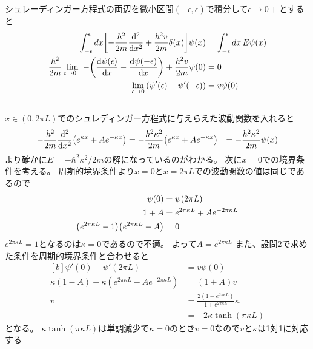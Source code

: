 \documentclass[../../sp_2014.tex]{subfiles}
\begin{document}
\subsection{}
シュレーディンガー方程式の両辺を微小区間\((-\epsilon,\epsilon)\)で積分して\(\epsilon\to0+\)とすると
\begin{equation}\begin{aligned}[b]
    \int_{-\epsilon}^\epsilon dx\qty[-\frac{\hbar^2}{2m}\dv[2]{x}+\frac{\hbar^2 v}{2m}\delta(x)]\psi(x)
    &= \int_{-\epsilon}^{\epsilon} dx\, E\psi(x)\\
    \frac{\hbar^2}{2m}\lim_{\epsilon\to0+}-\qty(\dv{\psi(\epsilon)}{x}-\dv{\psi(-\epsilon)}{x})+\frac{\hbar^2v}{2m}\psi(0)&=0\\
    \lim_{\epsilon\to0}\qty(\psi'(\epsilon)-\psi'(-\epsilon))&=v\psi(0)
\end{aligned}\end{equation}

\subsection{}
\(x\in (0,2\pi L)\)でのシュレディンガー方程式に与えらえた波動関数を入れると
\begin{equation}\begin{aligned}[b]
    -\frac{\hbar^2}{2m}\dv[2]{x}\qty(e^{\kappa x}+Ae^{-\kappa x}) &= -\frac{\hbar^2 \kappa^2}{2m}\qty(e^{\kappa x}+Ae^{-\kappa x})
    &= -\frac{\hbar^2\kappa^2}{2m}\psi(x)
\end{aligned}\end{equation}
より確かに\(E=-\hbar^2\kappa^2/2m\)の解になっているのがわかる。
次に\(x=0\)での境界条件を考える。
周期的境界条件より\(x=0\)と\(x=2\pi L\)での波動関数の値は同じであるので
\begin{equation}\begin{aligned}[b]
    \psi(0) &= \psi(2\pi L)\\
    1+A &= e^{2\pi\kappa L}+Ae^{-2\pi\kappa L}\\
    \qty(e^{2\pi\kappa L}-1)\qty(e^{2\pi\kappa L}-A) &= 0
\end{aligned}\end{equation}
\(e^{2\pi\kappa L}=1\)となるのは\(\kappa=0\)であるので不適。
よって\(A=e^{2\pi\kappa L}\)
また、設問2で求めた条件を周期的境界条件と合わせると
\begin{equation}\begin{aligned}[b]
    \psi'(0)-\psi'(2\pi L) &= v\psi(0)\\
    \kappa(1-A)-\kappa(e^{2\pi\kappa L}-Ae^{-2\pi\kappa L}) &= (1+A)v\\
    v &= \frac{2(1-e^{2\pi\kappa L})}{1+e^{2\pi\kappa L}}\kappa \\
    &= -2\kappa\tanh(\pi\kappa L)
\end{aligned}\end{equation}
となる。
\(\kappa\tanh(\pi\kappa L)\)は単調減少で\(\kappa=0\)のとき\(v=0\)なので\(v\)と\(\kappa\)は1対1に対応する
\end{document}
